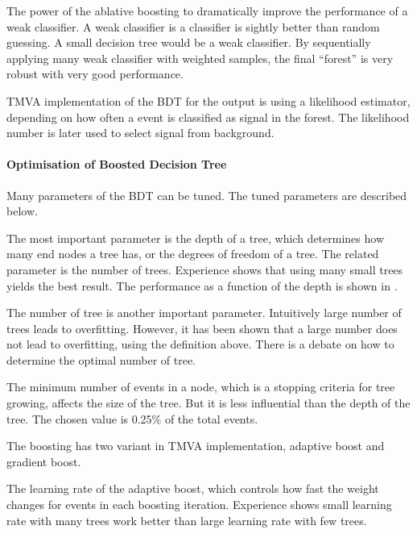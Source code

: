 The power of the ablative boosting to dramatically improve the performance of a weak classifier. A weak classifier is a classifier is sightly better than random guessing. A small decision tree would be a weak classifier. By sequentially applying many weak classifier with weighted samples, the final ``forest'' is very robust with very good performance.


TMVA implementation of the BDT for the output is using a likelihood estimator, depending on how often a event is classified as signal in the forest. The likelihood number is later used to select signal from background.

\paragraph{Optimisation of Boosted Decision Tree}

Many parameters of the BDT can be tuned. The tuned parameters are described below.

The most important parameter is the depth of a tree, which determines how many end nodes a tree has, or the degrees of freedom of a tree. The related parameter is the number of trees. Experience shows that using many small trees yields the best result. The performance as a function of the depth is shown in .

The number of tree is another important parameter. Intuitively large number of trees leads to overfitting. However, it has been shown that a large number does not lead to overfitting, using the definition above. There is a debate on how to determine the optimal number of tree.

The minimum number of events in a node, which is a stopping criteria for tree growing, affects the size of the tree. But it is less influential than the depth of the tree. The chosen value is 0.25\% of the total events.

The boosting has two variant in TMVA implementation, adaptive boost and gradient boost.

The learning rate of the adaptive boost, which controls how fast the weight changes for events in each boosting iteration. Experience shows small learning rate with many trees work better than large learning rate with few trees.

